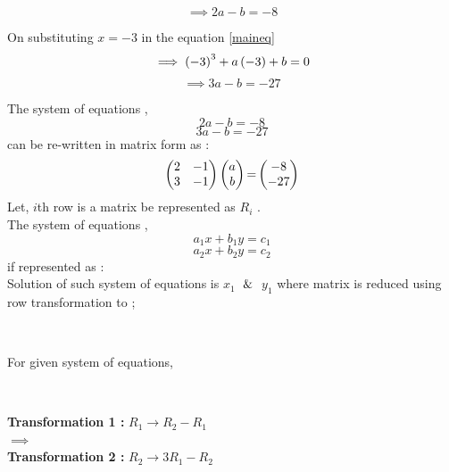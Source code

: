 \documentclass[journal,12pt,twocolumn]{IEEEtran}
\DeclareMathOperator*{\equals}{=}
\begin{document}
    \begin{equation}
    \label{eq1}
        \implies 2a-b=-8
    \end{equation}

    On substituting $x=-3$ in the equation \eqref{maineq}$$\implies \left(-3\right)^3+a\left(-3\right)+b=0$$
    \begin{equation}
    \label{eq2}
        \implies 3a-b=-27
    \end{equation}
    
    The system of equations ,
    $$2a-b=-8$$
    $$3a-b=-27$$
    can be re-written in matrix form as :
    $$\myvec{2&-1\\3&-1}\myvec{a\\b}\equals\myvec{-8\\-27}$$
    Let, $i$th row is a matrix be represented as $R_i$ .\\
    The system of equations ,
    $$a_1x+b_1y=c_1$$
    $$a_2x+b_2y=c_2$$
    if represented as :
    \\
    Solution of such system of equations is $x_1$ $\And$ $y_1$ where matrix is reduced using row transformation to ;\\
    \begin{center}
       \\
    \end{center}
    For given system of equations,\\
    
    \begin{center}
        \\
    \end{center}
    \textbf{Transformation 1 :} $R_1 \rightarrow R_2-R_1$\\
    
    $\implies$
    \\
    \textbf{Transformation 2 :} $R_2\rightarrow 3R_1-R_2$\\
    
\end{document}
